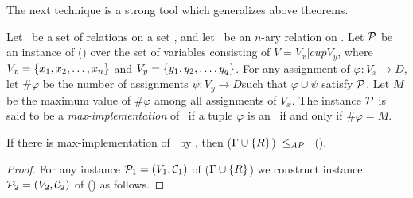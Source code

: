The next technique is a strong tool which generalizes above theorems. 

\begin{defi}\label{def:max}
Let \mrelset\ be a set of relations on a set \mD, and let \mR\ be an \(n\)-ary relation on \mD\@. 
Let \(\mathcal{P}\) be an instance of \ccsp(\mrelset) over the set of variables consisting of 
\(V = V_x |cup V_y\), where \(V_x = \{x_1,x_2,\dotsc,x_n\}\) and 
\(V_y=\{y_1,y_2,\dotsc,y_q\}\)\@. For any assignment of \(\varphi: V_x \to D\),
let \(\#\varphi\) be the number of assignments \(\psi : V_y \to D\)\@ such that 
\(\varphi \cup \psi\) satisfy \(\mathcal{P}\)\@. Let \(M\) be the maximum value of 
\(\#\varphi\) among all assignments of \(V_x\)\@. The instance \(\mathcal{P}\) is said to be
a \emph{max-implementation} of \mR\ if a tuple \(\varphi\) is an \mR\ if and only if
\(\#\varphi = M\)\@.
\end{defi}

\begin{theorem}\label{theo:max}
If there is max-implementation of \mR\ by \mrelset, then \ccsp(\(\Gamma \cup \{R\}\))~\(\le_{AP}\)~
\ccsp(\mrelset)\@.

\begin{proof}
For any instance \(\mathcal{P}_1 = (V_1,\mathcal{C}_1)\) of  \ccsp(\(\Gamma \cup \{R\}\)) we
construct instance \(\mathcal{P}_2 = (V_2,\mathcal{C}_2)\) of  \ccsp(\mrelset) as follows.
\end{proof}


\end{theorem}